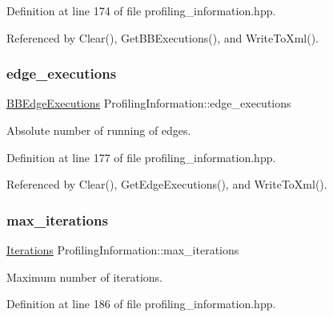 Definition at line 174 of file profiling\+\_\+information.\+hpp.



Referenced by Clear(), Get\+B\+B\+Executions(), and Write\+To\+Xml().

\mbox{\label{classProfilingInformation_a2603735372ee4e804d0585a0a309289e}} 
\subsubsection{\texorpdfstring{edge\+\_\+executions}{edge\_executions}}
{\footnotesize\ttfamily \hyperlink{classBBEdgeExecutions}{B\+B\+Edge\+Executions} Profiling\+Information\+::edge\+\_\+executions\hspace{0.3cm}{\ttfamily [private]}}



Absolute number of running of edges. 



Definition at line 177 of file profiling\+\_\+information.\+hpp.



Referenced by Clear(), Get\+Edge\+Executions(), and Write\+To\+Xml().

\mbox{\label{classProfilingInformation_adebc384d89658038b8df65b1558b09e5}} 
\subsubsection{\texorpdfstring{max\+\_\+iterations}{max\_iterations}}
{\footnotesize\ttfamily \hyperlink{classIterations}{Iterations} Profiling\+Information\+::max\+\_\+iterations\hspace{0.3cm}{\ttfamily [private]}}



Maximum number of iterations. 



Definition at line 186 of file profiling\+\_\+information.\+hpp.



